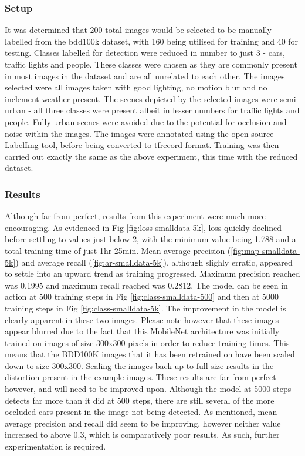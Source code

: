 \documentclass[12pt]{report}
\begin{document}
\subsubsection{Setup}
\begin{flushleft}
It was determined that 200 total images would be selected to be manually labelled from the bdd100k dataset, with 160 being utilised for training and 40 for testing. Classes labelled for detection were reduced in number to just 3 - cars, traffic lights and people. These classes were chosen as they are commonly present in most images in the dataset and are all unrelated to each other. The images selected were all images taken with good lighting, no motion blur and no inclement weather present. The scenes depicted by the selected images were semi-urban - all three classes were present albeit in lesser numbers for traffic lights and people. Fully urban scenes were avoided due to the potential for occlusion and noise within the images. The images were annotated using the open source LabelImg tool, before being converted to tfrecord format. Training was then carried out exactly the same as the above experiment, this time with the reduced dataset.
\end{flushleft}

\subsubsection{Results}
\begin{flushleft}
Although far from perfect, results from this experiment were much more encouraging. As evidenced in Fig \ref{fig:loss-smalldata-5k}, loss quickly declined before settling to values just below 2, with the minimum value being 1.788 and a total training time of just 1hr 25min. Mean average precision (\ref{fig:map-smalldata-5k}) and average recall (\ref{fig:ar-smalldata-5k}), although slighly erratic, appeared to settle into an upward trend as training progressed. Maximum precision reached was 0.1995 and maximum recall reached was 0.2812. The model can be seen in action at 500 training steps in Fig \ref{fig:class-smalldata-500} and then at 5000 training steps in Fig \ref{fig:class-smalldata-5k}. The improvement in the model is clearly apparent in these two images. Please note however that these images appear blurred due to the fact that this MobileNet architecture was initially trained on images of size 300x300 pixels in order to reduce training times. This means that the BDD100K images that it has been retrained on have been scaled down to size 300x300. Scaling the images back up to full size results in the distortion present in the example images. These results are far from perfect however, and will need to be improved upon. Although the model at 5000 steps detects far more than it did at 500 steps, there are still several of the more occluded cars present in the image not being detected. As mentioned, mean average precision and recall did seem to be improving, however neither value increased to above 0.3, which is comparatively poor results. As such, further experimentation is required.
\end{flushleft}
\end{document}
